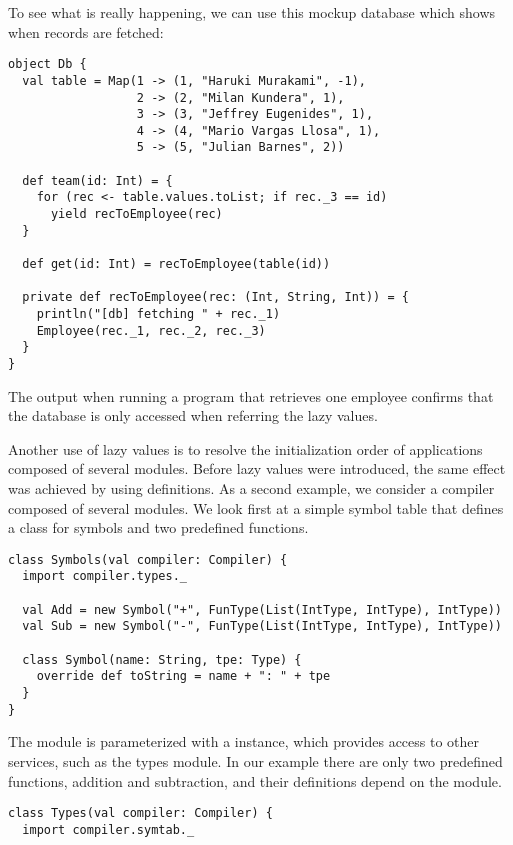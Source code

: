 {To see what is really happening, we can use this mockup
database which shows when records are fetched:
\begin{lstlisting}
object Db {
  val table = Map(1 -> (1, "Haruki Murakami", -1),
                  2 -> (2, "Milan Kundera", 1),
                  3 -> (3, "Jeffrey Eugenides", 1),
                  4 -> (4, "Mario Vargas Llosa", 1),
                  5 -> (5, "Julian Barnes", 2))

  def team(id: Int) = {
    for (rec <- table.values.toList; if rec._3 == id)
      yield recToEmployee(rec)
  }

  def get(id: Int) = recToEmployee(table(id))

  private def recToEmployee(rec: (Int, String, Int)) = {
    println("[db] fetching " + rec._1)
    Employee(rec._1, rec._2, rec._3)
  }
}
\end{lstlisting}
The output when running a program that retrieves one employee 
confirms that the database is only accessed when referring  the lazy
values.

Another use of lazy values is to resolve the
initialization order of applications composed of several
modules. Before lazy values were introduced, the same effect was
achieved by using \lstinline@object@ definitions. As a second example,
we consider a compiler composed of several modules. We look first at a
simple symbol table that defines a class for symbols and two
predefined functions.
\begin{lstlisting}
class Symbols(val compiler: Compiler) {
  import compiler.types._

  val Add = new Symbol("+", FunType(List(IntType, IntType), IntType))
  val Sub = new Symbol("-", FunType(List(IntType, IntType), IntType))

  class Symbol(name: String, tpe: Type) {
    override def toString = name + ": " + tpe
  }
}
\end{lstlisting}
The \lstinline@symbols@ module is parameterized with a \lstinline@Compiler@
instance, which provides access to other services, such as the types
module. In our example there are only two predefined functions,
addition and subtraction, and their definitions depend on the \lstinline@types@
module.
\begin{lstlisting}
class Types(val compiler: Compiler) {
  import compiler.symtab._


\end{lstlisting}}
